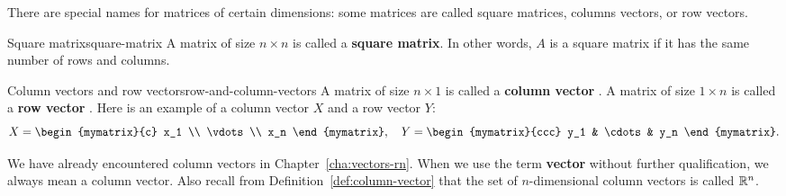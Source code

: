 There are special names for matrices of certain dimensions: some
matrices are called square matrices, columns vectors, or row vectors.

\begin{definition}{Square matrix}{square-matrix}
  A matrix of size $n\times n$ is called a \textbf{square
    matrix}.  In other
  words, $A$ is a square matrix if it has the same number of rows and
  columns.
\end{definition}

\begin{definition}{Column vectors and row vectors}{row-and-column-vectors}
  A matrix of size $n\times 1$ is called a \textbf{column vector}%
  . A matrix of size
  $1\times n$ is called a \textbf{row vector}%
  .
  Here is an example of a column vector $X$ and a row vector $Y$:
  \begin{equation*}
    X=\begin{mymatrix}{c}
      x_1 \\
      \vdots \\
      x_n
    \end{mymatrix},
    \quad
    Y = \begin{mymatrix}{ccc}
      y_1 & \cdots & y_n
    \end{mymatrix}.
  \end{equation*}
\end{definition}

We have already encountered column vectors in
Chapter~\ref{cha:vectors-rn}.  When we use the term \textbf{vector}
without further qualification, we always mean a column vector. Also
recall from Definition~\ref{def:column-vector} that the set of
$n$-dimensional column vectors is called $\mathbb{R}^n$.
